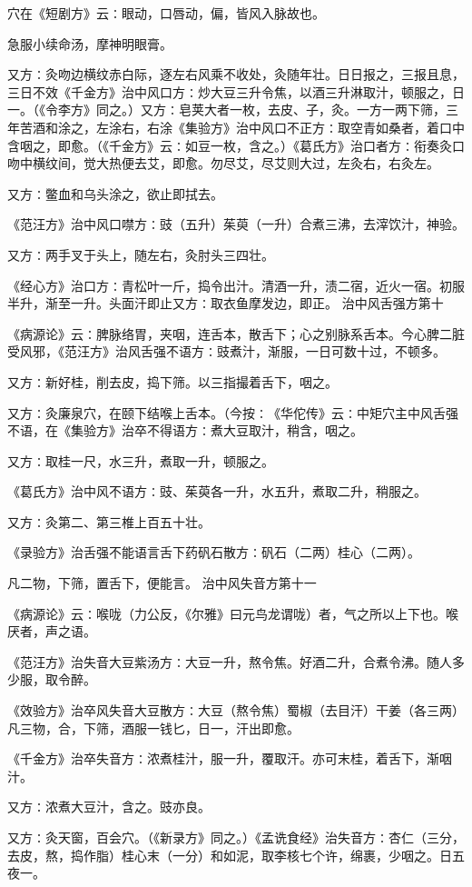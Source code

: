 \documentclass[a4paper,12pt,UTF8,twoside]{ctexbook}
\begin{document}
穴在《短剧方》云∶眼动，口唇动，偏，皆风入脉故也。

急服小续命汤，摩神明眼膏。

又方∶灸吻边横纹赤白际，逐左右风乘不收处，灸随年壮。日日报之，三报且息，三日不效《千金方》治中风口方∶炒大豆三升令焦，以酒三升淋取汁，顿服之，日一。（《令李方》同之。）又方∶皂荚大者一枚，去皮、子，灸。一方一两下筛，三年苦酒和涂之，左涂右，右涂《集验方》治中风口不正方∶取空青如桑者，着口中含咽之，即愈。（《千金方》云∶如豆一枚，含之。）《葛氏方》治口者方∶衔奏灸口吻中横纹间，觉大热便去艾，即愈。勿尽艾，尽艾则大过，左灸右，右灸左。

又方∶鳖血和乌头涂之，欲止即拭去。

《范汪方》治中风口噤方∶豉（五升）茱萸（一升）合煮三沸，去滓饮汁，神验。

又方∶两手叉于头上，随左右，灸肘头三四壮。

《经心方》治口方∶青松叶一斤，捣令出汁。清酒一升，渍二宿，近火一宿。初服半升，渐至一升。头面汗即止又方∶取衣鱼摩发边，即正。
治中风舌强方第十

《病源论》云∶脾脉络胃，夹咽，连舌本，散舌下；心之别脉系舌本。今心脾二脏受风邪，《范汪方》治风舌强不语方∶豉煮汁，渐服，一日可数十过，不顿多。

又方∶新好桂，削去皮，捣下筛。以三指撮着舌下，咽之。

又方∶灸廉泉穴，在颐下结喉上舌本。（今按∶《华佗传》云∶中矩穴主中风舌强不语，在《集验方》治卒不得语方∶煮大豆取汁，稍含，咽之。

又方∶取桂一尺，水三升，煮取一升，顿服之。

《葛氏方》治中风不语方∶豉、茱萸各一升，水五升，煮取二升，稍服之。

又方∶灸第二、第三椎上百五十壮。

《录验方》治舌强不能语言舌下药矾石散方∶矾石（二两）桂心（二两）。

凡二物，下筛，置舌下，便能言。
治中风失音方第十一

《病源论》云∶喉咙（力公反，《尔雅》曰元鸟龙谓咙）者，气之所以上下也。喉厌者，声之语。

《范汪方》治失音大豆紫汤方∶大豆一升，熬令焦。好酒二升，合煮令沸。随人多少服，取令醉。

《效验方》治卒风失音大豆散方∶大豆（熬令焦）蜀椒（去目汗）干姜（各三两）凡三物，合，下筛，酒服一钱匕，日一，汗出即愈。

《千金方》治卒失音方∶浓煮桂汁，服一升，覆取汗。亦可末桂，着舌下，渐咽汁。

又方∶浓煮大豆汁，含之。豉亦良。

又方∶灸天窗，百会穴。（《新录方》同之。）《孟诜食经》治失音方∶杏仁（三分，去皮，熬，捣作脂）桂心末（一分）和如泥，取李核七个许，绵裹，少咽之。日五夜一。
\end{document}
